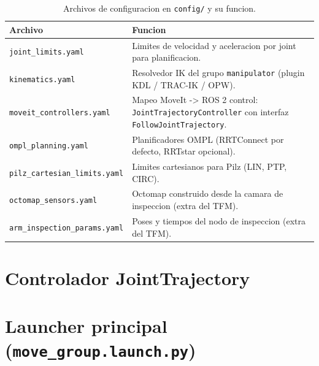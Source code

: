 \documentclass[11pt,a4paper]{article}
\begin{document}
\begin{table}[H]
  \centering
  \caption{Archivos de configuracion en \texttt{config/} y su funcion.}
  \label{tab:yamls}
  \begin{tabularx}{\linewidth}{lX}
    \toprule
    Archivo & Funcion \\
    \midrule
    \texttt{joint\_limits.yaml}         & Limites de velocidad y aceleracion por joint para planificacion. \\
    \texttt{kinematics.yaml}            & Resolvedor IK del grupo \texttt{manipulator} (plugin KDL / TRAC-IK / OPW). \\
    \texttt{moveit\_controllers.yaml}   & Mapeo MoveIt -> ROS 2 control: \texttt{JointTrajectoryController} con interfaz \texttt{FollowJointTrajectory}. \\
    \texttt{ompl\_planning.yaml}        & Planificadores OMPL (RRTConnect por defecto, RRTstar opcional). \\
    \texttt{pilz\_cartesian\_limits.yaml} & Limites cartesianos para Pilz (LIN, PTP, CIRC). \\
    \texttt{octomap\_sensors.yaml}      & Octomap construido desde la camara de inspeccion (extra del TFM). \\
    \texttt{arm\_inspection\_params.yaml} & Poses y tiempos del nodo de inspeccion (extra del TFM). \\
    \bottomrule
  \end{tabularx}
\end{table}

\section{Controlador JointTrajectory}
\label{sec:controller}


\section{Launcher principal (\texttt{move\_group.launch.py})}
\label{sec:launcher}

\end{document}
